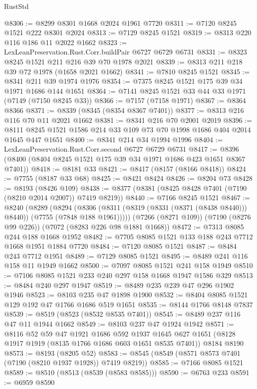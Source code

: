 \begin{lexlean}{RustStd}
\begin{coremodule}
@8306 := @8299 @8301 @1668 @2024 @1961 @7720
@8311 := @7120 @8245 @1521 @222 @8301 @2024
@8313 := @7129 @8245 @1521
@8319 := @8313 @220 @116 @186 @11 @2022 @1662
@8323 := LexLeanPreservation.Rust.Corr.buildPair @6727 @6729 @6731
@8331 := @8323 @8245 @1521 @211 @216 @39 @70 @1978 @2021
@8339 := @8313 @211 @218 @39 @72 @1978 (@1658 @2021 @1662)
@8341 := @7810 @8245 @1521
@8345 := @8341 @211 @39 @1974 @1976
@8354 := @7375 @8245 @1521 @175 @39 @34 @1971 @1686 @144 @1651
@8364 := @7141 @8245 @1521 @33 @44 @33 @1971 (@7149 (@7150 @8245 @33))
@8366 := @7157 (@7158 @1971)
@8367 := @8364 @8366
@8371 := @8339 (@8345 (@8354 @8367 @7401))
@8377 := @8313 @216 @116 @70 @11 @2021 @1662
@8381 := @8341 @216 @70 @2001 @2019
@8396 := @8111 @8245 @1521 @1586 @214 @33 @109 @73 @70 @1998 @1686 @404 @2014 @1645 @447 @1651
@8400 := @8341 @214 @34 @1994 @1996
@8404 := LexLeanPreservation.Rust.Corr.second @6727 @6729 @6731
@8417 := @8396 (@8400 (@8404 @8245 @1521 @175 @39 @34 @1971 @1686 @423 @1651 @8367 @7401))
@8418 := @8181 @33
@8421 := @8417 (@8157 (@8166 @8418))
@8424 := @7755 (@8187 @33 @68)
@8425 := @8421 @8424
@8426 := @8204 @73
@8428 := @8193 (@8426 @109)
@8438 := @8377 (@8381 (@8425 @8428 @7401 (@7190 (@8210 @2014 @2007)) @7419 @8219))
@8440 := @7166 @8245 @1521
@8467 := @8240
    (@8289
      (@8294
        (@8306 (@8311 (@8319 (@8331 (@8371 (@8438 @8440))) @8440)) (@7755 (@7848 @188 @1961)))))
    (@7266 (@8271 @109))
    (@7190 (@8276 @99 @226))
    (@7072 (@8283 @226 @98 @1881 @1668))
@8472 := @7313 @8085 @244 @188 @1668 @1952
@8482 := @7705 @8085 @1521 @133 @188 @243 @7712 @1668 @1951 @1884 @7720
@8484 := @7120 @8085 @1521
@8487 := @8484 @243 @7712 @1951
@8489 := @7129 @8085 @1521
@8495 := @8489 @241 @116 @158 @11 @1949 @1662
@8500 := @7097 @8085 @1521 @241 @158 @1949
@8510 := @7106 @8085 @1521 @233 @240 @297 @158 @1668 @1947 @1586 @329
@8513 := @8484 @240 @297 @1947
@8519 := @8489 @235 @239 @47 @296 @1902 @1946
@8523 := @8103 @235 @47 @1898 @1900
@8532 := @8404 @8085 @1521 @129 @192 @47 @1766 @1686 @519 @1651
@8535 := @8144 @1766 @8148 @7837
@8539 := @8519 (@8523 (@8532 @8535 @7401))
@8545 := @8489 @237 @116 @47 @11 @1944 @1662
@8549 := @8103 @237 @47 @1924 @1942
@8571 := @8116
    @52
    @59
    @47
    @1921
    @1686
    @592
    @1937
    @1645
    @627
    @1651
    (@8128 @1917 @1919 (@8135 @1766 @1686 @603 @1651 @8535 @7401))
    @8184
    @8190
@8573 := @8193 (@8205 @52)
@8583 := @8545 (@8549 (@8571 @8573 @7401 (@7190 (@8210 @1937 @1928)) @7419 @8219))
@8585 := @7166 @8085 @1521
@8589 := @8510 (@8513 (@8539 (@8583 @8585)))
@8590 := @6763 @233
@8591 := @6959 @8590

\end{coremodule}
\end{lexlean}
